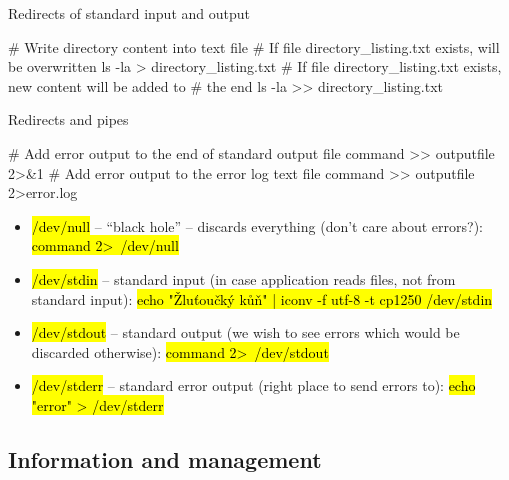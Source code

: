 \documentclass[compress, ucs, xelatex, 11pt, xcolor=svgnames,
  hyperref={
    bookmarks=true,
    unicode=true,
    colorlinks=true,
    pdftitle={Linux, command line and MetaCentrum},
    plainpages=false,
    pdfauthor={Vojtech Zeisek},
    pdfsubject={Course about use of Linux command line, writing shell scripts and using MetaCentrum of CESNET},
    pdfcreator={XeLaTeX},
    pdfkeywords={Linux, GNU, BASH, shell, command line, MetaCentrum},
    linkcolor=DarkRed,
    anchorcolor=DarkBlue,
    citecolor=Indigo,
    filecolor=NavyBlue,
    menucolor=DarkMagenta,
    urlcolor=DarkBlue,
    pdftex},
  url={hyphens, lowtilde} %
  ]{beamer}
\renewcommand{\texttt}[1]{\hl{\ttfamily #1}}
\begin{document}
\begin{frame}[fragile]{Redirects of standard input and output}
  \begin{bashcode}
    # Write directory content into text file
    # If file directory_listing.txt exists, will be overwritten
    ls -la > directory_listing.txt
    # If file directory_listing.txt exists, new content will be added to
    # the end
    ls -la >> directory_listing.txt
  \end{bashcode}
\end{frame}

\begin{frame}[fragile, label=pipe]{Redirects and pipes}
  \begin{bashcode}
    # Add error output to the end of standard output file
    command >> outputfile 2>&1
    # Add error output to the error log text file
    command >> outputfile 2>error.log
  \end{bashcode}
\begin{itemize}
  \item \texttt{/dev/null} -- ``black hole'' -- discards everything (don't care about errors?): \texttt{command 2\textgreater~/dev/null}
  \item \texttt{/dev/stdin} -- standard input (in case application reads files, not from standard input): \texttt{echo "Žluťoučký kůň" | iconv -f utf-8 -t cp1250 /dev/stdin}
  \item \texttt{/dev/stdout} -- standard output (we wish to see errors which would be discarded otherwise): \texttt{command 2\textgreater~/dev/stdout}
  \item \texttt{/dev/stderr} -- standard error output (right place to send errors to): \texttt{echo "error" > /dev/stderr}
\end{itemize}
\end{frame}

\subsection{Information and management}
\end{document}
